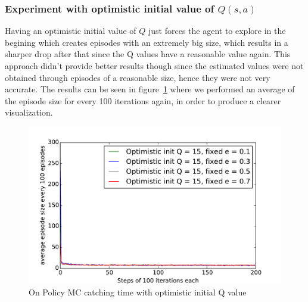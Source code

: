 \documentclass[paper=a4, fontsize=11pt]{scrartcl}
\numberwithin{equation}{section}		%
\numberwithin{figure}{section}			%
\numberwithin{table}{section}				%
\begin{document}
\subsubsection*{Experiment with optimistic initial value of $Q(s,a)$}
Having an optimistic initial value of $Q$ just forces the agent to explore in the begining which creates episodes with an extremely big size, which results in a sharper drop after that since the Q values have a reasonable value again. This approach didn't provide better results though since the estimated values were not obtained through episodes of a reasonable size, hence they were not very accurate. The results can be seen in figure~\ref{figure:differentFixEpsilonOnOpt} where we performed an average of the episode size for every 100 iterations again, in order to produce a clearer visualization.
\begin{figure}[h] \centering
\includegraphics[scale=0.65]{optQOnpolicy.pdf}
\caption{On Policy MC catching time with optimistic initial Q value} \label{figure:differentFixEpsilonOnOpt}
\end{figure}
\end{document}
